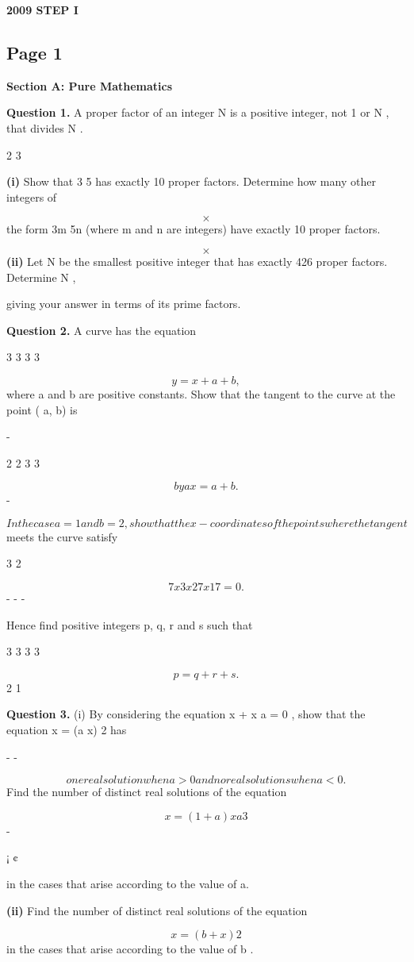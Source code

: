 \documentclass[12pt]{article}
\begin{document}
\begin{center}
{\Large \textbf{2009 STEP I}}
\end{center}

\subsection*{Page 1}
\begin{flushleft}
\bigskip\textbf{Section A: Pure Mathematics}\par
\bigskip\textbf{Question 1.} A proper factor of an integer N is a positive integer, not 1 or N , that divides N .\par
2 3\par
\textbf{(i)} Show that 3 5 has exactly 10 proper factors. Determine how many other integers of\par
\[\times\]
the form 3m 5n (where m and n are integers) have exactly 10 proper factors.\par
\[\times\]
\textbf{(ii)} Let N be the smallest positive integer that has exactly 426 proper factors. Determine N ,\par
giving your answer in terms of its prime factors.\par
\bigskip\textbf{Question 2.} A curve has the equation\par
3 3 3 3\par
\[y = x + a + b ,\]
where a and b are positive constants. Show that the tangent to the curve at the point ( a, b) is\par
-\par
2 2 3 3\par
\[b y a x = a + b .\]
-\par
\[In the case a = 1 and b = 2, show that the x-coordinates of the points where the tangent\]
meets the curve satisfy\par
3 2\par
\[7x 3x 27x 17 = 0 .\]
- - -\par
Hence find positive integers p, q, r and s such that\par
3 3 3 3\par
\[p = q + r + s .\]
2 1\par
\bigskip\textbf{Question 3.} (i) By considering the equation x + x a = 0 , show that the equation x = (a x) 2 has\par
- -\par
\[one real solution when a > 0 and no real solutions when a < 0 .\]
Find the number of distinct real solutions of the equation\par
\[x = (1 + a)x a 3\]
-\par
¡ ¢\par
in the cases that arise according to the value of a.\par
\textbf{(ii)} Find the number of distinct real solutions of the equation\par
\[x = (b + x) 2\]
in the cases that arise according to the value of b .\par
\end{flushleft}
\end{document}
